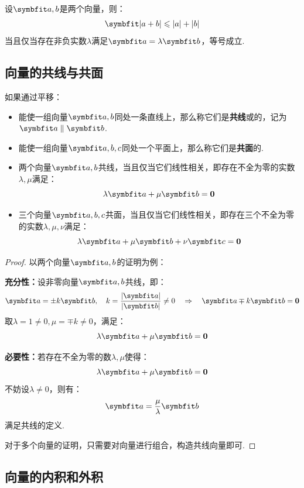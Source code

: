 \begin{theorem}
    设$\vb{a,b}$是两个向量，则：
    \[\vb{|a+b| \leqslant |a| + |b|}\]
    当且仅当存在非负实数$\lambda$满足$\vb{a} = \lambda\vb{b}$，等号成立.
\end{theorem}


\subsection{向量的共线与共面}
\begin{definition}
    如果通过平移：
    \begin{itemize}
        \item 能使一组向量$\vb{a,b}$同处一条直线上，那么称它们是\textbf{共线}或的，记为$\vb{a}\parallel\vb{b}$.
        \item 能使一组向量$\vb{a,b,c}$同处一个平面上，那么称它们是\textbf{共面}的.
    \end{itemize}
\end{definition}

\begin{theorem}
    \begin{itemize}
        \item 两个向量$\vb{a,b}$共线，当且仅当它们线性相关，即存在不全为零的实数$\lambda,\mu$满足：
        \[\lambda\vb{a} + \mu\vb{b} = \bm{0}\]
        \item 三个向量$\vb{a,b,c}$共面，当且仅当它们线性相关，即存在三个不全为零的实数$\lambda,\mu,\nu$满足：
        \[\lambda\vb{a} + \mu\vb{b} + \nu\vb{c} = \bm{0}\]
    \end{itemize}
\end{theorem}

\begin{proof}
    以两个向量$\vb{a,b}$的证明为例：

    \textbf{充分性：}设非零向量$\vb{a,b}$共线，即：
    \[\vb{a} = \pm k \vb{b},\quad k = \frac{|\vb{a}|}{|\vb{b}|} \neq 0 \quad\Rightarrow\quad \vb{a} \mp k \vb{b} = \bm{0}\]
    取$\lambda = 1 \neq 0,\mu = \mp k \neq 0$，满足：
    \[\lambda \vb{a} + \mu \vb{b} = \bm{0}\]

    \textbf{必要性：}若存在不全为零的数$\lambda,\mu$使得：
    \[\lambda \vb{a} + \mu \vb{b} = \bm{0}\]
    不妨设$\lambda \neq 0$，则有：
    \[\vb{a} = \frac{\mu}{\lambda}\vb{b}\]
    满足共线的定义.

    对于多个向量的证明，只需要对向量进行组合，构造共线向量即可.
\end{proof}


\subsection{向量的内积和外积}
